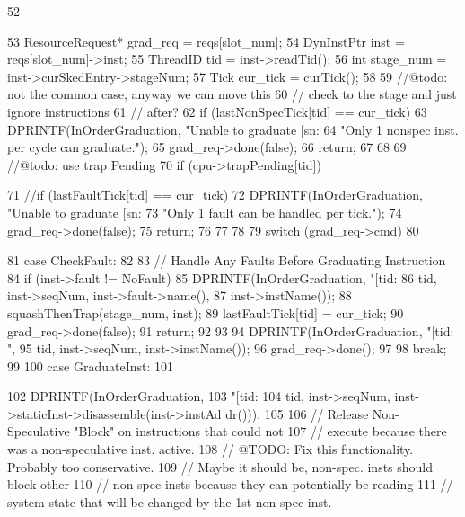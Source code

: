 \begin{DoxyCode}
52 {
53     ResourceRequest* grad_req = reqs[slot_num];
54     DynInstPtr inst = reqs[slot_num]->inst;
55     ThreadID tid = inst->readTid();
56     int stage_num = inst->curSkedEntry->stageNum;
57     Tick cur_tick = curTick();
58 
59     //@todo: not the common case, anyway we can move this
60     //       check to the stage and just ignore instructions
61     //       after?
62     if (lastNonSpecTick[tid] == cur_tick) {
63         DPRINTF(InOrderGraduation, "Unable to graduate [sn:%
64                 "Only 1 nonspec inst. per cycle can graduate.\n");
65         grad_req->done(false);
66         return;
67     }
68 
69     //@todo: use trap Pending
70     if (cpu->trapPending[tid]) {
71         //if (lastFaultTick[tid] == cur_tick) {
72         DPRINTF(InOrderGraduation, "Unable to graduate [sn:%
73                 "Only 1 fault can be handled per tick.\n");
74         grad_req->done(false);
75         return;
76     }
77 
78 
79     switch (grad_req->cmd)
80     {
81       case CheckFault:
82         {
83             // Handle Any Faults Before Graduating Instruction
84             if (inst->fault != NoFault) {
85                 DPRINTF(InOrderGraduation, "[tid:%
86                         tid, inst->seqNum, inst->fault->name(),
87                         inst->instName());
88                 squashThenTrap(stage_num, inst);
89                 lastFaultTick[tid] = cur_tick;
90                 grad_req->done(false);
91                 return;
92             }
93 
94             DPRINTF(InOrderGraduation, "[tid:%
      ",
95                     tid, inst->seqNum, inst->instName());
96             grad_req->done();
97         }
98         break;
99 
100       case GraduateInst:
101         {
102             DPRINTF(InOrderGraduation,
103                     "[tid:%
104                     tid, inst->seqNum, inst->staticInst->disassemble(inst->instAd
      dr()));
105 
106             // Release Non-Speculative "Block" on instructions that could not
107             // execute because there was a non-speculative inst. active.
108             // @TODO: Fix this functionality. Probably too conservative.
109             //        Maybe it should be, non-spec. insts should block other
110             //        non-spec insts because they can potentially be reading
111             //        system state that will be changed by the 1st non-spec inst.
      
}}}}
\end{DoxyCode}

